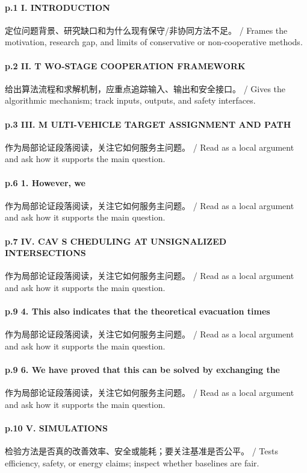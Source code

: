 \documentclass[UTF8,a4paper,11pt,fontset=fandol]{ctexart}
\begin{document}
\paragraph{p.1 I. INTRODUCTION}定位问题背景、研究缺口和为什么现有保守/非协同方法不足。 / Frames the motivation, research gap, and limits of conservative or non-cooperative methods.

\paragraph{p.2 II. T WO-STAGE COOPERATION FRAMEWORK}给出算法流程和求解机制，应重点追踪输入、输出和安全接口。 / Gives the algorithmic mechanism; track inputs, outputs, and safety interfaces.

\paragraph{p.3 III. M ULTI-VEHICLE TARGET ASSIGNMENT AND PATH}作为局部论证段落阅读，关注它如何服务主问题。 / Read as a local argument and ask how it supports the main question.

\paragraph{p.6 1. However, we}作为局部论证段落阅读，关注它如何服务主问题。 / Read as a local argument and ask how it supports the main question.

\paragraph{p.7 IV. CAV S CHEDULING AT UNSIGNALIZED INTERSECTIONS}作为局部论证段落阅读，关注它如何服务主问题。 / Read as a local argument and ask how it supports the main question.

\paragraph{p.9 4. This also indicates that the theoretical evacuation times}作为局部论证段落阅读，关注它如何服务主问题。 / Read as a local argument and ask how it supports the main question.

\paragraph{p.9 6. We have proved that this can be solved by exchanging the}作为局部论证段落阅读，关注它如何服务主问题。 / Read as a local argument and ask how it supports the main question.

\paragraph{p.10 V. SIMULATIONS}检验方法是否真的改善效率、安全或能耗；要关注基准是否公平。 / Tests efficiency, safety, or energy claims; inspect whether baselines are fair.
\end{document}

